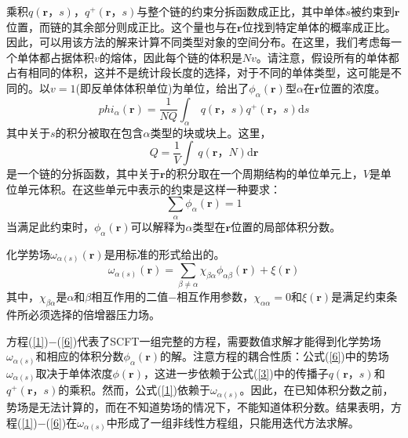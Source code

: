 \documentclass[12pt，a4paper]{article}
\numberwithin{equation}{section}
\begin{document}
乘积$q(\mathbf{r}，s)，q^{+}(\mathbf{r}，s)$与整个链的约束分拆函数成正比，其中单体$s$被约束到$\mathbf{r}$位置，而链的其余部分则成正比。这个量也与在$\mathbf{r}$位找到特定单体的概率成正比。因此，可以用该方法的解来计算不同类型对象的空间分布。在这里，我们考虑每一个单体都占据体积$v$的熔体，因此每个链的体积是$Nv$。请注意，假设所有的单体都占有相同的体积，这并不是统计段长度的选择，对于不同的单体类型，这可能是不同的。以$v=1$(即反单体体积单位)为单位，给出了$\phi_{\alpha}(\mathbf{r})$型$\alpha$在$\mathbf{r}$位置的浓度。
\begin{equation}\label{3}
phi_{\alpha}(\mathbf{r})=\frac{1}{NQ}\int _{\alpha}~q(\mathbf{r}，s)q^{+}(\mathbf{r}，s) \mathrm{d}s
\end{equation}
其中关于$s$的积分被取在包含$\alpha$类型的块或块上。这里，
\begin{equation}\label{4}
Q=\frac{1}{V}\int ~q(\mathbf{r}，N) \mathrm{d}\mathbf{r}
\end{equation}
是一个链的分拆函数，其中关于$\mathbf{r}$的积分取在一个周期结构的单位单元上，$V$是单位单元体积。在这些单元中表示的约束是这样一种要求：
\begin{equation}\label{5}
\sum _{\alpha}\phi_{\alpha}(\mathbf{r})=1
\end{equation}
当满足此约束时，$\phi_{\alpha}(\mathbf{r})$可以解释为$\alpha$类型在$\mathbf{r}$位置的局部体积分数。

化学势场$\omega_{\alpha (s)}(\mathbf{r})$是用标准的形式给出的。
\begin{equation}\label{6}
\omega_{\alpha (s)}(\mathbf{r})=\sum _{\beta \neq \alpha} \chi_{\beta \alpha}\phi_{\alpha \beta}(\mathbf{r})+\xi(\mathbf{r})
\end{equation}
其中，$\chi_{\beta \alpha}$是$\alpha$和$\beta$相互作用的二值−相互作用参数，$\chi_{\alpha \alpha}=0$和$\xi(\mathbf{r})$是满足约束条件所必须选择的倍增器压力场。

方程(\ref{1})−(\ref{6})代表了SCFT一组完整的方程，需要数值求解才能得到化学势场$\omega_{\alpha (s)}$和相应的体积分数$\phi_{\alpha}(\mathbf{r})$的解。注意方程的耦合性质：公式(\ref{6})中的势场$\omega_{\alpha (s)}$取决于单体浓度$\phi(\mathbf{r})$，这进一步依赖于公式(\ref{3})中的传播子$q(\mathbf{r}，s)$和$q^{+}(\mathbf{r}，s)$的乘积。然而，公式(\ref{1})依赖于$\omega_{\alpha (s)}$。因此，在已知体积分数之前，势场是无法计算的，而在不知道势场的情况下，不能知道体积分数。结果表明，方程(\ref{1})−(\ref{6})在$\omega_{\alpha (s)}$中形成了一组非线性方程组，只能用迭代方法求解。
\end{document}
